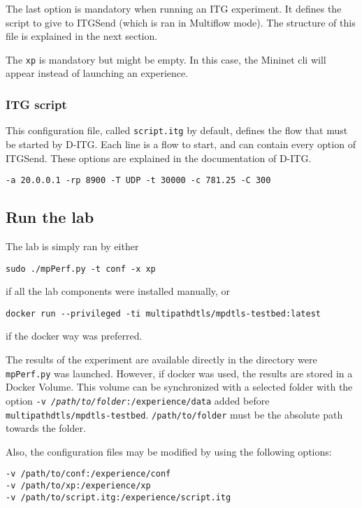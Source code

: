 The last option is mandatory when running an ITG experiment. It defines the script to give to ITGSend (which is ran in Multiflow mode). The structure of this file is explained in the next section.

The \texttt{xp} is mandatory but might be empty. In this case, the Mininet cli will appear instead of launching an experience.

\subsubsection{ITG script}

This configuration file, called \texttt{script.itg} by default, defines the flow that must be started by D-ITG. Each line is a flow to start, and can contain every option of ITGSend. These options are explained in the documentation of D-ITG\cite{ditg}.

\begin{lstlisting}[caption=Default content of \texttt{script.itg}]
-a 20.0.0.1 -rp 8900 -T UDP -t 30000 -c 781.25 -C 300
\end{lstlisting}

\subsection{Run the lab}

The lab is simply ran by either 
\begin{lstlisting}
sudo ./mpPerf.py -t conf -x xp
\end{lstlisting}
if all the lab components were installed manually, or
\begin{lstlisting}
docker run --privileged -ti multipathdtls/mpdtls-testbed:latest
\end{lstlisting}
if the docker way was preferred.

The results of the experiment are available directly in the directory were \texttt{mpPerf.py} was launched. However, if docker was used, the results are stored in a Docker Volume. This volume can be synchronized with a selected folder with the option \texttt{-v \textit{/path/to/folder}:/experience/data} added before \texttt{multipathdtls/mpdtls-testbed}. \texttt{/path/to/folder} must be the absolute path towards the folder.

Also, the configuration files may be modified by using the following options:

\begin{lstlisting}
-v /path/to/conf:/experience/conf
-v /path/to/xp:/experience/xp
-v /path/to/script.itg:/experience/script.itg
\end{lstlisting}

